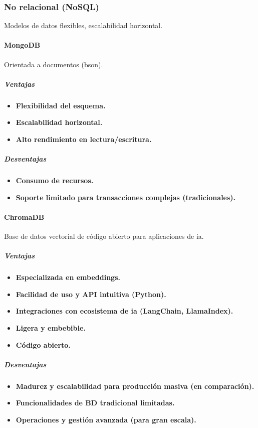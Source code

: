 \subsubsection{No relacional (NoSQL)}
Modelos de datos flexibles, escalabilidad horizontal.

\paragraph{MongoDB}
Orientada a documentos (\gls{bson}).
\subparagraph{Ventajas}
\begin{itemize}
    \item \textbf{Flexibilidad del esquema.}
    \item \textbf{Escalabilidad horizontal.}
    \item \textbf{Alto rendimiento en lectura/escritura.}
\end{itemize}
\subparagraph{Desventajas}
\begin{itemize}
    \item \textbf{Consumo de recursos.}
    \item \textbf{Soporte limitado para transacciones complejas (tradicionales).}
\end{itemize}

\paragraph{ChromaDB}
Base de datos vectorial de código abierto para aplicaciones de \gls{ia}.
\subparagraph{Ventajas}
\begin{itemize}
    \item \textbf{Especializada en embeddings.}
    \item \textbf{Facilidad de uso y API intuitiva (Python).}
    \item \textbf{Integraciones con ecosistema de \gls{ia} (LangChain, LlamaIndex).}
    \item \textbf{Ligera y embebible.}
    \item \textbf{Código abierto.}
\end{itemize}
\subparagraph{Desventajas}
\begin{itemize}
    \item \textbf{Madurez y escalabilidad para producción masiva (en comparación).}
    \item \textbf{Funcionalidades de BD tradicional limitadas.}
    \item \textbf{Operaciones y gestión avanzada (para gran escala).}
\end{itemize}

